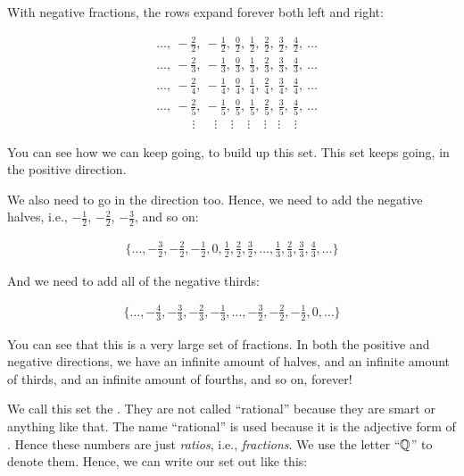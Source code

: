 \documentclass[../../../main.tex]{subfiles}
\begin{document}
\begin{aside}
  \begin{remark}
    With negative fractions, the rows expand forever both left and right:
    
    \begin{align*}
      &\ldots,~-\frac{2}{2},~-\frac{1}{2},~\frac{0}{2},~\frac{1}{2},~\frac{2}{2},~\frac{3}{2},~\frac{4}{2},~\ldots \\
      &\ldots,~-\frac{2}{3},~-\frac{1}{3},~\frac{0}{3},~\frac{1}{3},~\frac{2}{3},~\frac{3}{3},~\frac{4}{3},~\ldots \\
      &\ldots,~-\frac{2}{4},~-\frac{1}{4},~\frac{0}{4},~\frac{1}{4},~\frac{2}{4},~\frac{3}{4},~\frac{4}{4},~\ldots \\
      &\ldots,~-\frac{2}{5},~-\frac{1}{5},~\frac{0}{5},~\frac{1}{5},~\frac{2}{5},~\frac{3}{5},~\frac{4}{5},~\ldots \\
      &~~~~~~~~~~~~~\vdots~~~~~~~\vdots~~~~~\vdots~~~~~\vdots~~~~~\vdots~~~~\vdots~~~~~\vdots
    \end{align*}
  \end{remark}
\end{aside}

You can see how we can keep going, to build up this set. This set keeps going, in the positive direction.

We also need to go in the  direction too. Hence, we need to add the negative halves, i.e., $-\frac{1}{2}$, $-\frac{2}{2}$, $-\frac{3}{2}$, and so on:

\begin{align*}
  \{ \ldots, -\frac{3}{2}, -\frac{2}{2}, -\frac{1}{2}, 0, \frac{1}{2}, \frac{2}{2}, \frac{3}{2}, \ldots, \frac{1}{3}, \frac{2}{3}, \frac{3}{3}, \frac{4}{3}, \ldots \}
\end{align*}

And we need to add all of the negative thirds:

\begin{align*}
  \{ \ldots, -\frac{4}{3}, -\frac{3}{3}, -\frac{2}{3}, -\frac{1}{3}, \ldots, -\frac{3}{2}, -\frac{2}{2}, -\frac{1}{2}, 0, \ldots \}
\end{align*}

You can see that this is a very large set of fractions. In both the positive and negative directions, we have an infinite amount of halves, and an infinite amount of thirds, and an infinite amount of fourths, and so on, forever! 

We call this set the . They are not called ``rational'' because they are smart or anything like that. The name ``rational'' is used because it is the adjective form of . Hence these numbers are just \emph{ratios}, i.e., \emph{fractions}. We use the letter ``$\Rationals/$'' to denote them. Hence, we can write our set out like this:
\end{document}
